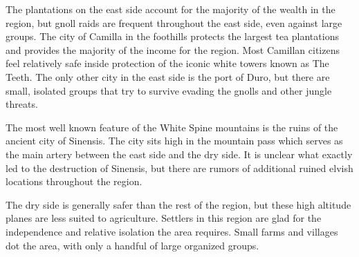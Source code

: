 The plantations on the east side account for the majority of the wealth in the region, but gnoll raids are frequent throughout the east side, even against large groups.
The city of Camilla in the foothills protects the largest tea plantations and provides the majority of the income for the region.
Most Camillan citizens feel relatively safe inside protection of the iconic white towers known as The Teeth.
The only other city in the east side is the port of Duro, but there are small, isolated groups that try to survive evading the gnolls and other jungle threats.

The most well known feature of the White Spine mountains is the ruins of the ancient city of Sinensis.
The city sits high in the mountain pass which serves as the main artery between the east side and the dry side.
It is unclear what exactly led to the destruction of Sinensis, but there are rumors of additional ruined elvish locations throughout the region.

The dry side is generally safer than the rest of the region, but these high altitude planes are less suited to agriculture.
Settlers in this region are glad for the independence and relative isolation the area requires.
Small farms and villages dot the area, with only a handful of large organized groups.
